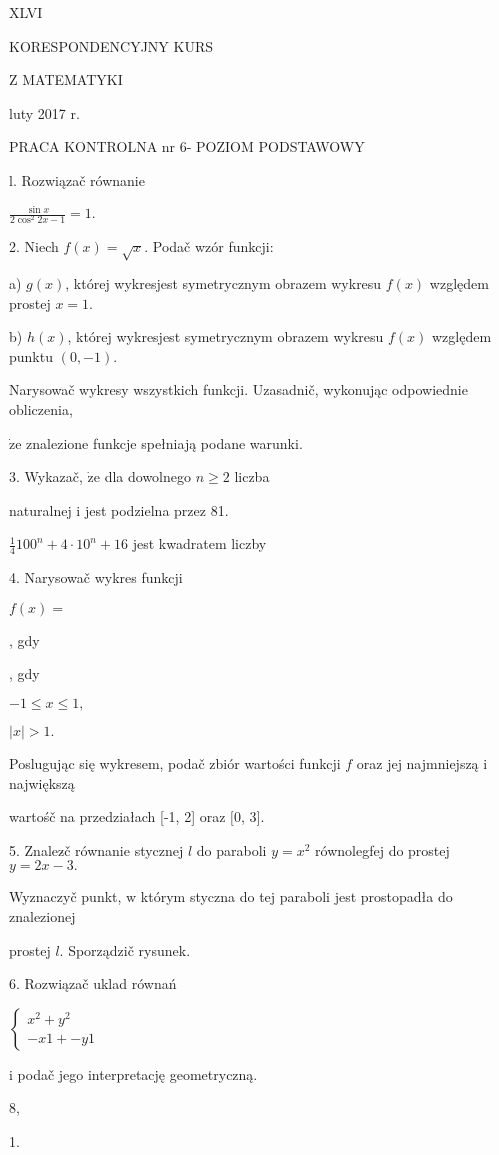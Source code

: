 \documentclass[a4paper,12pt]{article}
\begin{document}
XLVI

KORESPONDENCYJNY KURS

Z MATEMATYKI

luty 2017 r.

PRACA KONTROLNA nr 6- POZIOM PODSTAWOWY

l. Rozwiązač równanie

$\displaystyle \frac{\sin x}{2\cos^{2}2x-1}=1.$

2. Niech $f(x)=\sqrt{x}$. Podač wzór funkcji:

a) $g(x)$, której wykresjest symetrycznym obrazem wykresu $f(x)$ względem prostej $x=1.$

b) $h(x)$, której wykresjest symetrycznym obrazem wykresu $f(x)$ względem punktu $(0,-1).$

Narysowač wykresy wszystkich funkcji. Uzasadnič, wykonując odpowiednie obliczenia,

$\dot{\mathrm{z}}\mathrm{e}$ znalezione funkcje spełniają podane warunki.

3. Wykazač, $\dot{\mathrm{z}}\mathrm{e}$ dla dowolnego $n\geq 2$ liczba

naturalnej $\mathrm{i}$ jest podzielna przez 81.

$\displaystyle \frac{1}{4} 100^{n}+4\cdot 10^{n}+16$ jest kwadratem liczby

4. Narysowač wykres funkcji

$f(x)=$

, gdy

, gdy

$-1\leq x\leq 1,$

$|x|>1.$

Poslugując się wykresem, podač zbiór wartości funkcji $f$ oraz jej najmniejszą $\mathrm{i}$ największą

wartośč na przedziałach [-1, 2] oraz $[0$, 3$].$

5. Znalez$\acute{}$č równanie stycznej $l$ do paraboli $y=x^{2}$ równolegfej do prostej $y=2x-3.$

Wyznaczyč punkt, $\mathrm{w}$ którym styczna do tej paraboli jest prostopadła do znalezionej

prostej $l$. Sporządzič rysunek.

6. Rozwiązač uklad równań

$\left\{\begin{array}{l}
x^{2}+y^{2}\\
- x1+-y1
\end{array}\right.$

$\mathrm{i}$ podač jego interpretację geometryczną.

8,

1.
\end{document}
